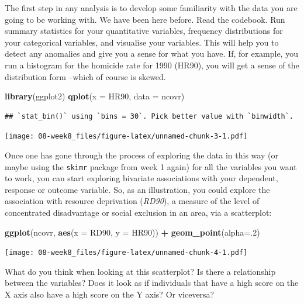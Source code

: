 \documentclass[]{book}
\newenvironment{Shaded}{\begin{snugshade}}{\end{snugshade}}
\newcommand{\DataTypeTok}[1]{\textcolor[rgb]{0.13,0.29,0.53}{#1}}
\newcommand{\DecValTok}[1]{\textcolor[rgb]{0.00,0.00,0.81}{#1}}
\newcommand{\KeywordTok}[1]{\textcolor[rgb]{0.13,0.29,0.53}{\textbf{#1}}}
\newcommand{\NormalTok}[1]{#1}
\newcommand{\OperatorTok}[1]{\textcolor[rgb]{0.81,0.36,0.00}{\textbf{#1}}}
\newcommand{\StringTok}[1]{\textcolor[rgb]{0.31,0.60,0.02}{#1}}
\begin{document}
The first step in any analysis is to develop some familiarity with the data you are going to be working with. We have been here before. Read the codebook. Run summary statistics for your quantitative variables, frequency distributions for your categorical variables, and visualise your variables. This will help you to detect any anomalies and give you a sense for what you have. If, for example, you run a histogram for the homicide rate for 1990 (HR90), you will get a sense of the distribution form --which of course is skewed.

\begin{Shaded}
\begin{Highlighting}[]
\KeywordTok{library}\NormalTok{(ggplot2)}
\KeywordTok{qplot}\NormalTok{(}\DataTypeTok{x =}\NormalTok{ HR90, }\DataTypeTok{data =}\NormalTok{ ncovr)}
\end{Highlighting}
\end{Shaded}

\begin{verbatim}
## `stat_bin()` using `bins = 30`. Pick better value with `binwidth`.
\end{verbatim}

\texttt{[image: 08-week8\_files/figure-latex/unnamed-chunk-3-1.pdf]}

Once one has gone through the process of exploring the data in this way (or maybe using the \texttt{skimr} package from week 1 again) for all the variables you want to work, you can start exploring bivariate associations with your dependent, response or outcome variable. So, as an illustration, you could explore the association with resource deprivation (\emph{RD90}), a measure of the level of concentrated disadvantage or social exclusion in an area, via a scatterplot:

\begin{Shaded}
\begin{Highlighting}[]
\KeywordTok{ggplot}\NormalTok{(ncovr, }\KeywordTok{aes}\NormalTok{(}\DataTypeTok{x =}\NormalTok{ RD90, }\DataTypeTok{y =}\NormalTok{ HR90)) }\OperatorTok{+}
\StringTok{  }\KeywordTok{geom_point}\NormalTok{(}\DataTypeTok{alpha=}\NormalTok{.}\DecValTok{2}\NormalTok{) }
\end{Highlighting}
\end{Shaded}

\texttt{[image: 08-week8\_files/figure-latex/unnamed-chunk-4-1.pdf]}

What do you think when looking at this scatterplot? Is there a relationship between the variables? Does it look as if individuals that have a high score on the X axis also have a high score on the Y axis? Or viceversa?
\end{document}
